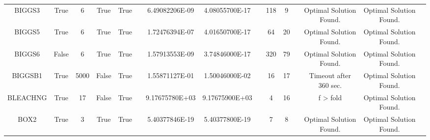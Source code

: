 \begin{longtable}{ccccccccccccccc}
	\cellcolor{default2} BIGGS3& \cellcolor{default2} True& \cellcolor{default2} 6& \cellcolor{default2} True& \cellcolor{default2} True& \cellcolor{header} & \cellcolor{ok} 6.49082206E-09& \cellcolor{best} 4.08055700E-17& \cellcolor{header} & \cellcolor{poor} 118& \cellcolor{best} 9& \cellcolor{header} & \cellcolor{default2} Optimal Solution Found.& \cellcolor{default2} Optimal Solution Found.& \cellcolor{header} \\
	\cellcolor{default1} BIGGS5& \cellcolor{default1} True& \cellcolor{default1} 6& \cellcolor{default1} True& \cellcolor{default1} True& \cellcolor{header} & \cellcolor{ok} 1.72476394E-07& \cellcolor{best} 4.01650700E-17& \cellcolor{header} & \cellcolor{poor} 64& \cellcolor{best} 20& \cellcolor{header} & \cellcolor{default1} Optimal Solution Found.& \cellcolor{default1} Optimal Solution Found.& \cellcolor{header} \\
	\cellcolor{default2} BIGGS6& \cellcolor{default2} False& \cellcolor{default2} 6& \cellcolor{default2} True& \cellcolor{default2} True& \cellcolor{header} & \cellcolor{ok} 1.57913553E-09& \cellcolor{best} 3.74846000E-17& \cellcolor{header} & \cellcolor{poor} 320& \cellcolor{best} 79& \cellcolor{header} & \cellcolor{default2} Optimal Solution Found.& \cellcolor{default2} Optimal Solution Found.& \cellcolor{header} \\
	\cellcolor{default1} BIGGSB1& \cellcolor{default1} True& \cellcolor{default1} 5000& \cellcolor{default1} False& \cellcolor{default1} True& \cellcolor{header} & \cellcolor{poor} 1.55871127E-01& \cellcolor{best} 1.50046000E-02& \cellcolor{header} & \cellcolor{best} 16& \cellcolor{ok} 17& \cellcolor{header} & \cellcolor{default1} Timeout after 360 sec.& \cellcolor{default1} Optimal Solution Found.& \cellcolor{header} \\
	\cellcolor{default2} BLEACHNG& \cellcolor{default2} True& \cellcolor{default2} 17& \cellcolor{default2} False& \cellcolor{default2} True& \cellcolor{header} & \cellcolor{best} 9.17675780E+03& \cellcolor{ok} 9.17675900E+03& \cellcolor{header} & \cellcolor{best} 4& \cellcolor{poor} 16& \cellcolor{header} & \cellcolor{default2} f > fold& \cellcolor{default2} Optimal Solution Found.& \cellcolor{header} \\
	\cellcolor{default1} BOX2& \cellcolor{default1} True& \cellcolor{default1} 3& \cellcolor{default1} True& \cellcolor{default1} True& \cellcolor{header} & \cellcolor{ok} 5.40377846E-19& \cellcolor{best} 5.40377800E-19& \cellcolor{header} & \cellcolor{best} 7& \cellcolor{ok} 8& \cellcolor{header} & \cellcolor{default1} Optimal Solution Found.& \cellcolor{default1} Optimal Solution Found.& \cellcolor{header} \\

\end{longtable}
